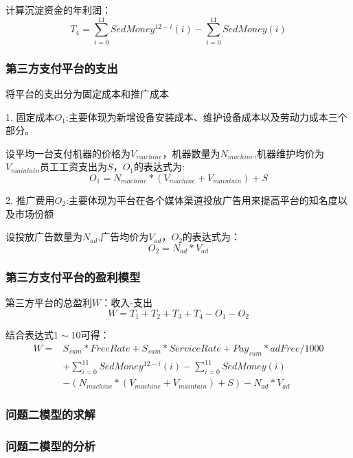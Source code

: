 \documentclass[withoutpreface,bwprint]{cumcmthesis} %
\begin{document}
计算沉淀资金的年利润：
\begin{equation}
T_4=\sum_{i=0}^{11} SedMoney^{12-i}(i)-\sum_{i=0}^{11} SedMoney(i)
\end{equation}

\subsubsection{第三方支付平台的支出}
将平台的支出分为固定成本和推广成本

1. 固定成本$O_1$:主要体现为新增设备安装成本、维护设备成本以及劳动力成本三个部分。

设平均一台支付机器的价格为$V_{machine}$，机器数量为$N_{machine}$,机器维护均价为$V_{maintain}$员工工资支出为$S$，$O_1$的表达式为:
\begin{equation}
O_1=N_{machine}*(V_{machine}+V_{maintain})+S
\end{equation}

2. 推广费用$O_2$:主要体现为平台在各个媒体渠道投放广告用来提高平台的知名度以及市场份额

设投放广告数量为$N_{ad}$,广告均价为$V_{ad}$，$O_2$的表达式为：
\begin{equation}
O_2=N_{ad}*V_{ad}
\end{equation}

\subsubsection{第三方支付平台的盈利模型}
第三方平台的总盈利$W$：收入-支出
\begin{equation}
W=T_1+T_2+T_3+T_4-O_1-O_2
\end{equation}

结合表达式$1\sim10$可得：
\begin{equation}
\begin{split}
W=&S_{sum}*FreeRate+S_{sum}*ServiceRate+Pay_{sum}*adFree/1000\\&+\sum_{i=0}^{11} SedMoney^{12-i}(i)-\sum_{i=0}^{11} SedMoney(i)\\&-(N_{machine}*(V_{machine}+V_{maintain})+S)-N_{ad}*V_{ad}
\end{split}
\end{equation}

\subsubsection{问题二模型的求解}
\subsubsection{问题二模型的分析}
\end{document}
